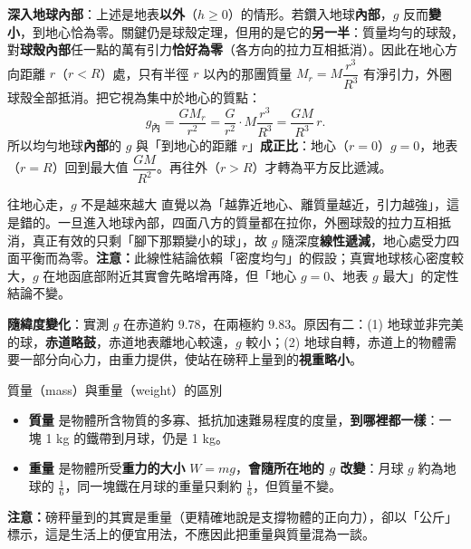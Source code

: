 \documentclass[11pt]{article}
\begin{document}

\textbf{深入地球內部}：上述是地表\textbf{以外}（$h\ge0$）的情形。若鑽入地球\textbf{內部}，$g$ 反而\textbf{變小}，到地心恰為零。關鍵仍是球殼定理，但用的是它的\textbf{另一半}：質量均勻的球殼，對\textbf{球殼內部}任一點的萬有引力\textbf{恰好為零}（各方向的拉力互相抵消）。因此在地心方向距離 $r$（$r<R$）處，只有半徑 $r$ 以內的那團質量 $M_r=M\dfrac{r^3}{R^3}$ 有淨引力，外圈球殼全部抵消。把它視為集中於地心的質點：
$$g_{\text{內}}=\dfrac{G M_r}{r^{2}}=\dfrac{G}{r^2}\cdot M\dfrac{r^3}{R^3}=\dfrac{GM}{R^3}\,r.$$
所以均勻地球\textbf{內部}的 $g$ 與「到地心的距離 $r$」\textbf{成正比}：地心（$r=0$）$g=0$，地表（$r=R$）回到最大值 $\dfrac{GM}{R^2}$。再往外（$r>R$）才轉為平方反比遞減。


\begin{補充框}{往地心走，$g$ 不是越來越大}
直覺以為「越靠近地心、離質量越近，引力越強」，這是錯的。一旦進入地球內部，四面八方的質量都在拉你，外圈球殼的拉力互相抵消，真正有效的只剩「腳下那顆變小的球」，故 $g$ 隨深度\textbf{線性遞減}，地心處受力四面平衡而為零。\textbf{注意：}此線性結論依賴「密度均勻」的假設；真實地球核心密度較大，$g$ 在地函底部附近其實會先略增再降，但「地心 $g=0$、地表 $g$ 最大」的定性結論不變。
\end{補充框}

\textbf{隨緯度變化}：實測 $g$ 在赤道約 $9.78$，在兩極約 $9.83$。原因有二：(1) 地球並非完美的球，\textbf{赤道略鼓}，赤道地表離地心較遠，$g$ 較小；(2) 地球自轉，赤道上的物體需要一部分向心力，由重力提供，使站在磅秤上量到的\textbf{視重略小}。

\begin{補充框}{質量（mass）與重量（weight）的區別}
\begin{itemize}\setlength{\itemsep}{1pt}
\item \textbf{質量} 是物體所含物質的多寡、抵抗加速難易程度的度量，\textbf{到哪裡都一樣}：一塊 1 kg 的鐵帶到月球，仍是 1 kg。
\item \textbf{重量} 是物體所受\textbf{重力的大小} $W=mg$，\textbf{會隨所在地的 $g$ 改變}：月球 $g$ 約為地球的 $\tfrac16$，同一塊鐵在月球的重量只剩約 $\tfrac16$，但質量不變。
\end{itemize}
\textbf{注意：}磅秤量到的其實是重量（更精確地說是支撐物體的正向力），卻以「公斤」標示，這是生活上的便宜用法，不應因此把重量與質量混為一談。
\end{補充框}
\end{document}
